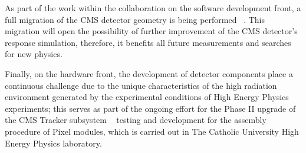 \documentclass[10pt]{article}
\begin{document}
As part of the work within the collaboration on the software development front, a full migration of the CMS detector geometry is being performed ~\cite{dd4hep}. This migration will open the possibility of further improvement of the CMS detector’s response simulation, therefore, it benefits all future measurements and searches for new physics. 

Finally, on the hardware front, the development of detector components place a continuous challenge due to the unique characteristics of the high radiation environment generated by the experimental conditions of High Energy Physics experiments; this serves as part of the ongoing effort for the Phase II upgrade of the CMS Tracker subsystem ~\cite{phase2tdr} testing and development for the assembly procedure of Pixel modules, which is carried out in The Catholic University High Energy Physics laboratory. 



\clearpage



\end{document}
